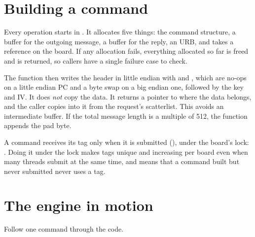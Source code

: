 \section{Building a command}

Every operation starts in . It allocates five things: the command structure, a buffer for the outgoing message, a buffer for the reply, an URB, and takes a reference on the board. If any allocation fails, everything allocated so far is freed and  is returned, so callers have a single failure case to check.

The function then writes the header in little endian with  and , which are no-ops on a little endian PC and a byte swap on a big endian one, followed by the key and IV. It does \emph{not} copy the data. It returns a pointer to where the data belongs, and the caller copies into it from the request's scatterlist. This avoids an intermediate buffer. If the total message length is a multiple of 512, the function appends the pad byte.

A command receives its tag only when it is submitted (), under the board's lock: . Doing it under the lock makes tags unique and increasing per board even when many threads submit at the same time, and means that a command built but never submitted never uses a tag.

\section{The engine in motion}

Follow one command through the code.

